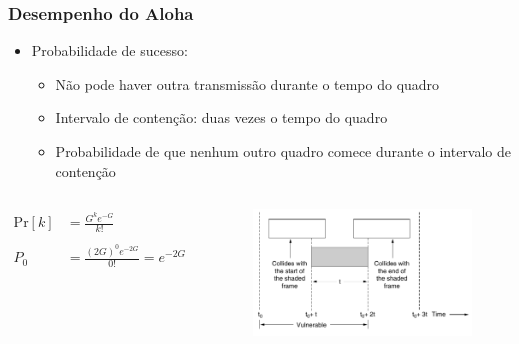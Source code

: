 \begin{frame}
	\frametitle{Desempenho do Aloha}

	\begin{itemize}
		\item Probabilidade de sucesso:
		\begin{itemize}
		    \item Não pode haver outra transmissão durante o tempo do quadro
		    \item Intervalo de contenção: duas vezes o tempo do quadro
		    \item Probabilidade de que nenhum outro quadro comece durante o intervalo de contenção
		\end{itemize}
	\end{itemize}
	
	\begin{columns}
		\begin{small}
		\begin{align*}
		    \mathrm{Pr}[k] &= \frac{G^k e^{-G}}{k!} \\ \\
		    P_0 &= \frac{(2G)^0 e^{-2G}}{0!} = e^{-2G} \\		    
		\end{align*}
		\end{small}
		
		\begin{figure}[t]
			\begin{center}
				\includegraphics[width=0.9\columnwidth]{figs/fig04-02}
			\end{center}
		\end{figure}
	\end{columns}
\end{frame}

